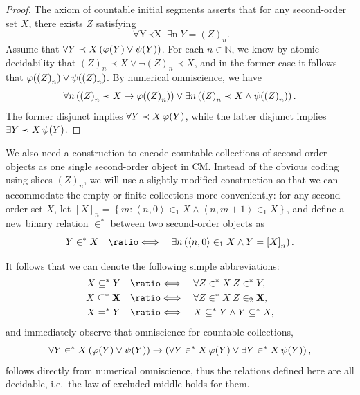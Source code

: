 \documentclass[12pt,openany]{book}
\theoremstyle{plain}
\theoremstyle{definition}
\newcommand\tuple[1]{\left\langle #1 \right\rangle}
\newcommand\opA[1]{\mathop{\forall #1}}
\newcommand\opE[1]{\mathop{\exists #1}}
\newcommand\defeqv{\quad \ratio\Longleftrightarrow \quad}
\newcommand\CM{\mathrm{CM}}
\begin{document}
\begin{proof}
  The axiom of countable initial segments asserts that for any second-order set $X$, there exists $Z$ satisfying
  \[\opA{Y \prec X} \opE{n} Y = \left(Z\right)_n.\]
  Assume that $\opA{Y \prec X} \left(\varphi\mleft(Y\mright) \lor \psi\mleft(Y\mright)\right)$. For each $n \in \mathbb{N}$, we know by atomic decidability that $\left(Z\right)_n \prec X \lor \neg \left(Z\right)_n \prec X$, and in the former case it follows that $\varphi\mleft(\left(Z\right)_n\mright) \lor \psi\mleft(\left(Z\right)_n\mright)$. By numerical omniscience, we have
  \[\opA{n} \left(\left(Z\right)_n \prec X \rightarrow \varphi\mleft(\left(Z\right)_n\mright)\right) \lor \opE{n} \left(\left(Z\right)_n \prec X \land \psi\mleft(\left(Z\right)_n\mright)\right).\]
  The former disjunct implies $\opA{Y \prec X} \varphi\mleft(Y\mright)$, while the latter disjunct implies $\opE{Y \prec X} \psi\mleft(Y\mright)$.
\end{proof}

We also need a construction to encode countable collections of second-order objects as one single second-order object in $\CM$. Instead of the obvious coding using slices $\left(Z\right)_n$, we will use a slightly modified construction so that we can accommodate the empty or finite collections more conveniently: for any second-order set $X$, let $\left[X\right]_n = \left\{m : \tuple{n, 0} \in_1 X \land \tuple{n, m + 1} \in_1 X\right\}$, and define a new binary relation $\in^*$ between two second-order objects as
\[Y \in^* X \defeqv \opE{n} \left(\tuple{n, 0} \in_1 X \land Y = \left[X\right]_n\right).\]

It follows that we can denote the following simple abbreviations:
\begin{align*}
  X \subseteq^* Y          & \defeqv \opA{Z \in^* X} Z \in^* Y,             \\
  X \subseteq^* \mathbf{X} & \defeqv \opA{Z \in^* X} Z \in_2 \mathbf{X},    \\
  X =^* Y                  & \defeqv X \subseteq^* Y \land Y \subseteq^* X,
\end{align*}
and immediately observe that omniscience for countable collections,
\[\opA{Y \in^* X} \left(\varphi\mleft(Y\mright) \lor \psi\mleft(Y\mright)\right) \rightarrow \left(\opA{Y \in^* X} \varphi\mleft(Y\mright) \lor \opE{Y \in^* X} \psi\mleft(Y\mright)\right),\]
follows directly from numerical omniscience, thus the relations defined here are all decidable, i.e.\ the law of excluded middle holds for them.
\end{document}
